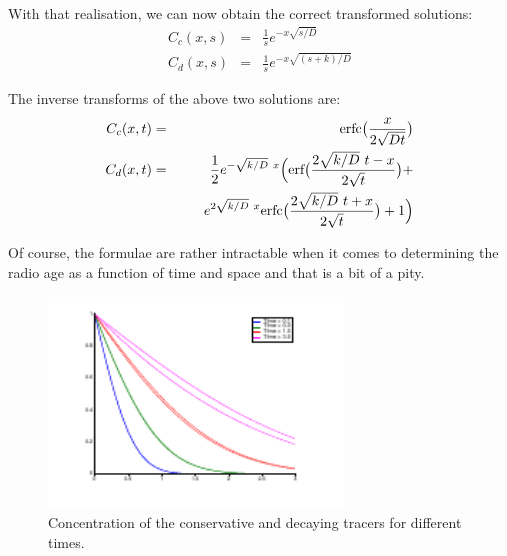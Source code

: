 \documentclass[onecolumn]{article}
\begin{document}
With that realisation, we can now obtain the correct transformed solutions:
\begin{eqnarray}
    C_c(x,s) &=& \frac{1}{s} e^{-x \sqrt{s/D}} \\
    C_d(x,s) &=& \frac{1}{s} e^{-x \sqrt{(s+k)/ D}}
\end{eqnarray}

The inverse transforms of the above two solutions are:
\begin{eqnarray}
\nonumber    C_c(x,t) &=& \textrm{erfc} \bigl(\frac{x}{2 \sqrt{Dt}} \bigr) \\
\nonumber    C_d(x,t) &=& \frac{1}{2} e^{-\sqrt{k/D}~x} \Bigl( \textrm{erf} \bigl(\frac{2\sqrt{k/D}~t -x}{2 \sqrt{t}} \bigr) + \\
                      & &             ~~~~~ e^{2 \sqrt{k/D}~x} \textrm{erfc} \bigl(\frac{2 \sqrt{k/D}~t + x} {2 \sqrt{t}} \bigr) + 1 \Bigr)
\end{eqnarray}

Of course, the formulae are rather intractable when it comes to determining the radio age as a function of time and space and that is
a bit of a pity.


\begin{figure}[H]
\caption{Concentration of the conservative and decaying tracers for different times.}
\label{conservative_decaying}
\begin{center}
\includegraphics[width=0.7\textwidth]{conservative_decaying.pdf}
\end{center}
\end{figure}
\end{document}
